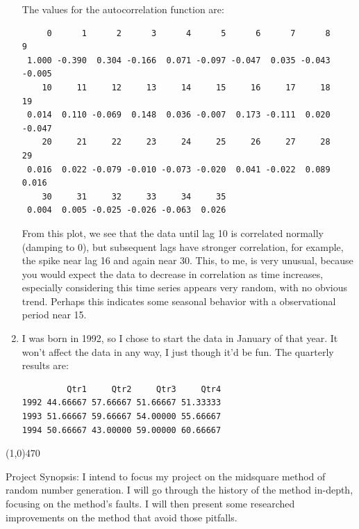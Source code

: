 \documentclass[11pt]{article} %
\begin{document}
\begin{enumerate}
The values for the autocorrelation function are:
\begin{verbatim}     0      1      2      3      4      5      6      7      8      9 
 1.000 -0.390  0.304 -0.166  0.071 -0.097 -0.047  0.035 -0.043 -0.005 
    10     11     12     13     14     15     16     17     18     19 
 0.014  0.110 -0.069  0.148  0.036 -0.007  0.173 -0.111  0.020 -0.047 
    20     21     22     23     24     25     26     27     28     29 
 0.016  0.022 -0.079 -0.010 -0.073 -0.020  0.041 -0.022  0.089  0.016 
    30     31     32     33     34     35 
 0.004  0.005 -0.025 -0.026 -0.063  0.026 \end{verbatim}

From this plot, we see that the data until lag 10 is correlated normally (damping to 0), but subsequent lags have stronger correlation, for example, the spike near lag 16 and again near 30.  This, to me, is very unusual, because you would expect the data to decrease in correlation as time increases, especially considering this time series appears very random, with no obvious trend.  Perhaps this indicates some seasonal behavior with a observational period near 15.

\item I was born in 1992, so I chose to start the data in January of that year.  It won't affect the data in any way, I just though it'd be fun.  The quarterly results are:
\begin{verbatim}         Qtr1     Qtr2     Qtr3     Qtr4
1992 44.66667 57.66667 51.66667 51.33333
1993 51.66667 59.66667 54.00000 55.66667
1994 50.66667 43.00000 59.00000 60.66667\end{verbatim}

\end{enumerate}

\line(1,0){470}

Project Synopsis: I intend to focus my project on the midsquare method of random number generation.  I will go through the history of the method in-depth, focusing on the method's faults.  I will then present some researched improvements on the method that avoid those pitfalls.
\end{document}

